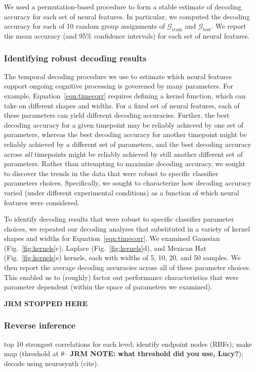 \documentclass[english]{article}
\begin{document}
We used a permutation-based procedure to form a stable estimate of
decoding accuracy for each set of neural features.  In particular, we
computed the decoding accuracy for each of 10 random group assignments of
$\mathcal{G}_{\mathrm{train}}$ and $\mathcal{G}_{\mathrm{test}}$.  We
report the mean accuracy (and 95\% confidence intervals) for each set
of neural features.


\subsubsection*{Identifying robust decoding results}
The temporal decoding procedure we use to estimate which neural
features support ongoing cognitive processing is goverened by many
parameters.  For example, Equation~\ref{eqn:timecorr} requires
defining a kernel function, which can take on different shapes and
widths.  For a fixed set of neural features, each of these parameters
can yield different decoding accuracies.  Further, the best decoding
accuracy for a given timepoint may be reliably achieved by one set of
parameters, whereas the best decoding accuracy for another timepoint
might be reliably achieved by a different set of parameters, and the
best decoding accuracy across \textit{all} timepoints might be
reliably achieved by still another different set of parameters.
Rather than attempting to maximize decoding accuracy, we sought to
discover the trends in the data that were robust to specific
classifier parameters choices.  Specifically, we sought to
characterize how decoding accuracy varied (under different
experimental conditions) as a function of which neural features were
considered.

To identify decoding results that were robust to specific classifier
parameter choices, we repeated our decoding analyses that substituted
in a variety of kernel shapes and widths for
Equation~\ref{eqn:timecorr}.  We examined Gaussian
(Fig.~\ref{fig:kernels}c), Laplace (Fig.~\ref{fig:kernels}d), and
Mexican Hat (Fig.~\ref{fig:kernels}e) kernels, each with widths of 5,
10, 20, and 50 samples.  We then report the average decoding
accuracies across all of these parameter choices.  This enabled us to
(roughly) factor out performance characteristics that were parameter
dependent (within the space of parameters we examined).

\textbf{JRM STOPPED HERE}

\subsubsection*{Reverse inference}
top 10 strongest correlations for each level; identify endpoint nodes
(RBFs); make map (threshold at $\theta$-- \textbf{JRM NOTE: what
  threshold did you use, Lucy?}); decode using neurosynth (cite).
\end{document}
